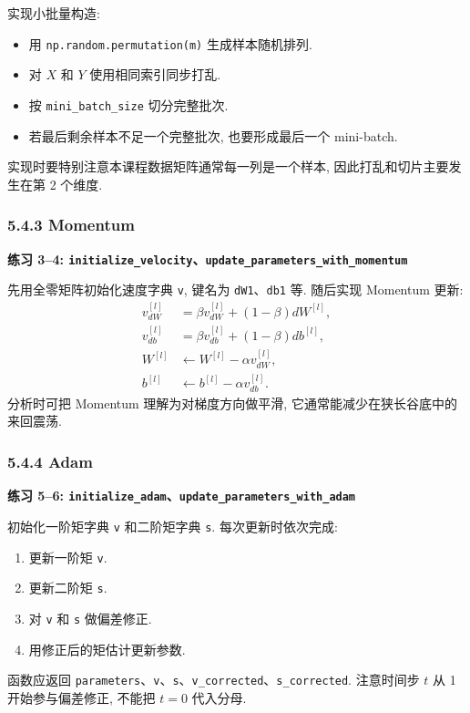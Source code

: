 \documentclass{../../nndlcourse}
\begin{document}
实现小批量构造:
\begin{itemize}
    \item 用 \texttt{np.random.permutation(m)} 生成样本随机排列.
    \item 对 $X$ 和 $Y$ 使用相同索引同步打乱.
    \item 按 \texttt{mini\_batch\_size} 切分完整批次.
    \item 若最后剩余样本不足一个完整批次, 也要形成最后一个 mini-batch.
\end{itemize}
实现时要特别注意本课程数据矩阵通常每一列是一个样本, 因此打乱和切片主要发生在第 2 个维度.

\subsubsection*{5.4.3 Momentum}

\textbf{练习 3--4: \texttt{initialize\_velocity}、\texttt{update\_parameters\_with\_momentum}}

先用全零矩阵初始化速度字典 \texttt{v}, 键名为 \texttt{dW1}、\texttt{db1} 等. 随后实现 Momentum 更新:
\begin{align}
    v_{dW}^{[l]} &= \beta v_{dW}^{[l]}+(1-\beta)dW^{[l]},\\
    v_{db}^{[l]} &= \beta v_{db}^{[l]}+(1-\beta)db^{[l]},\\
    W^{[l]} &\leftarrow W^{[l]}-\alpha v_{dW}^{[l]},\\
    b^{[l]} &\leftarrow b^{[l]}-\alpha v_{db}^{[l]}.
\end{align}
分析时可把 Momentum 理解为对梯度方向做平滑, 它通常能减少在狭长谷底中的来回震荡.

\subsubsection*{5.4.4 Adam}

\textbf{练习 5--6: \texttt{initialize\_adam}、\texttt{update\_parameters\_with\_adam}}

初始化一阶矩字典 \texttt{v} 和二阶矩字典 \texttt{s}. 每次更新时依次完成:
\begin{enumerate}
    \item 更新一阶矩 \texttt{v}.
    \item 更新二阶矩 \texttt{s}.
    \item 对 \texttt{v} 和 \texttt{s} 做偏差修正.
    \item 用修正后的矩估计更新参数.
\end{enumerate}
函数应返回 \texttt{parameters}、\texttt{v}、\texttt{s}、\texttt{v\_corrected}、\texttt{s\_corrected}. 注意时间步 $t$ 从 1 开始参与偏差修正, 不能把 $t=0$ 代入分母.
\end{document}
